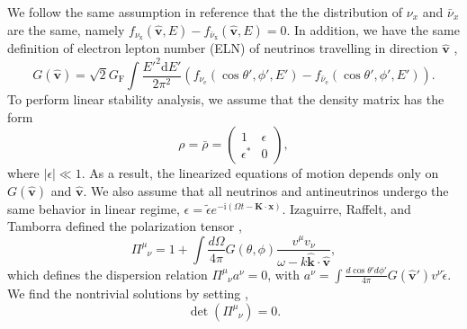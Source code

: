 \documentclass[%
preprint,
 amsmath,amssymb,
 aps,
 prd
]{revtex4-1}
\newcommand{\ii}{\mathrm i}
\begin{document}
We follow the same assumption in reference  that the the distribution of $\nu_x$ and $\bar\nu_x$ are the same, namely $ f_{\nu_{\mathrm x}}(\hat{\mathbf v},E)  - f_{\bar\nu_{\mathrm x}}(\hat{\mathbf v},E)=0$. In addition, we have the same definition of electron lepton number (ELN) of neutrinos travelling in direction $\hat{\mathbf v}$ \cite{Izaguirre2016a},
\begin{equation}
G(\hat{\mathbf v}) =  \sqrt{2}G_{\mathrm F} \int \frac{E'^2 \mathrm d E'}{2\pi^2} ( f_{\nu_{\mathrm e}}(\cos\theta',\phi',E')  - f_{\bar\nu_{\mathrm e}}(\cos\theta',\phi',E')  ).
\end{equation}
To perform linear stability analysis, we assume that the density matrix has the form
\begin{equation}
\rho = \bar \rho = \begin{pmatrix}
1 & \epsilon \\
\epsilon^* & 0
\end{pmatrix},
\end{equation}
where $\lvert \epsilon \rvert \ll 1$. As a result, the linearized equations of motion depends only on $G(\hat{\mathbf v})$ and $\hat{\mathbf v}$. We also assume that all neutrinos and antineutrinos undergo the same behavior in linear regime, $\epsilon = \tilde\epsilon e^{-\ii (\Omega t - \mathbf K\cdot \mathbf x)}$. Izaguirre, Raffelt, and Tamborra defined the polarization tensor \cite{Izaguirre2016a},
\begin{equation}
\Pi^\mu_{\phantom{\mu}\nu} = 1 + \int \frac{d\Omega}{4\pi} G(\theta,\phi) \frac{v^\mu v_\nu}{\omega- k \hat{\mathbf k}\cdot \hat{\mathbf v} },
\end{equation}
which defines the dispersion relation $\Pi^\mu_{\phantom{\mu}\nu} a^\nu = 0$, with $a^\nu = \int \frac{d\cos\theta' d\phi'}{4\pi} G(\hat{\mathbf v}') v^\nu \tilde\epsilon$. We find the nontrivial solutions by setting \cite{Izaguirre2016a}, 
\begin{equation}
\operatorname{det}\left( \Pi^\mu_{\phantom{\mu}\nu} \right) = 0.
\label{eqn-dr-determinant-equation}
\end{equation}
\end{document}
